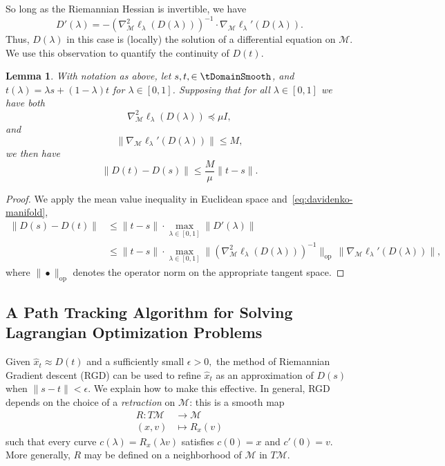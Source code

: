 \documentclass{article}
\numberwithin{equation}{section}
\newtheorem{lemma}{Lemma}[section]
\newcommand{\cM}{{\mathcal{M}}}
\begin{document}
So long as the Riemannian Hessian is invertible, we have
\begin{equation}\label{eq:davidenko-manifold}
     D'(\lambda ) = -(\nabla_{\cM}^2 \ell_\lambda(D(\lambda )))^{-1}\cdot \nabla_{\cM} \ell_\lambda ' (D(\lambda )).
\end{equation}
Thus, $D(\lambda )$ in this case is (locally) the solution of a differential equation on $\cM $.
We use this observation to quantify the continuity of $D(t).$

\begin{lemma}
\label{lem:mean_value}
    With notation as above, let $s,t, \in \tDomainSmooth$, and $t(\lambda) = \lambda s + (1-\lambda) t$ for $\lambda \in [0,1]$.
    Supposing that for all $\lambda \in [0,1]$ we have both 
    \begin{equation}\label{eq:bound-hessian}
        \nabla_{\cM}^2 \ell_\lambda (D(\lambda )) \preceq \mu I, 
    \end{equation}
    and    \begin{equation}\label{eq:bound-gradient-derivative}
        \|\nabla_{\cM} \ell_\lambda  '(D(\lambda ))\| \le M,
    \end{equation}
   we then have 
    \begin{equation}\label{eq:bound-lagrangian-section-continuity}
        \|D(t) - D(s)\| \le \frac{M}{\mu}\|t-s\|.
    \end{equation}
\end{lemma}
\begin{proof}
We apply the mean value inequality in Euclidean space and~\eqref{eq:davidenko-manifold}, 
\begin{align*}
\| D (s) - D(t) \| &\le   \|t-s\| \cdot \max_{\lambda \in [0,1]} \|D ' (\lambda ) \|\\
&\le  \|t-s\| \cdot  \displaystyle\max_{\lambda \in [0,1]} \| ( \nabla_\cM^2 \ell_\lambda (D(\lambda))
)^{-1}\|_{\text{op}} \, 
\|
\nabla_\cM \ell_\lambda ' (D(\lambda)) \|,
\end{align*}
where 
$\| \bullet \|_{\text{op}}$ denotes the operator norm on the appropriate tangent space.
    
\end{proof}
\subsection{A Path Tracking Algorithm for Solving Lagrangian Optimization Problems}
\label{subsec:CHORD}

Given $\hat{x}_t \approx D(t)$ and a sufficiently small $\epsilon >0,$ the method of Riemannian Gradient descent (RGD) can be used to refine $\hat{x}_t$ as an approximation of $D(s)$ when $\| s - t \| < \epsilon .$
We explain how to make this effective.
In general, RGD depends on the choice of a \emph{retraction} on $\cM$: this is a smooth map
\begin{align*}
R : T\cM &\to \cM \\
(x,v ) &\mapsto R_x (v) 
\end{align*}
such that every curve $c(\lambda ) = R_x (\lambda v)$ satisfies $c(0)=x$ and $c'(0)=v.$
More generally, $R$ may be defined on a neighborhood of $\cM$ in $T \cM .$
\end{document}
